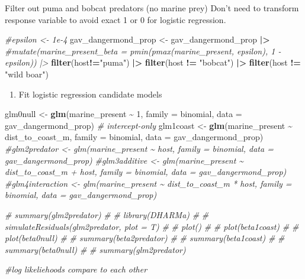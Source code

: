 \documentclass[
]{article}
\newenvironment{Shaded}{\begin{snugshade}}{\end{snugshade}}
\newcommand{\AttributeTok}[1]{\textcolor[rgb]{0.13,0.29,0.53}{#1}}
\newcommand{\CommentTok}[1]{\textcolor[rgb]{0.56,0.35,0.01}{\textit{#1}}}
\newcommand{\DecValTok}[1]{\textcolor[rgb]{0.00,0.00,0.81}{#1}}
\newcommand{\FunctionTok}[1]{\textcolor[rgb]{0.13,0.29,0.53}{\textbf{#1}}}
\newcommand{\NormalTok}[1]{#1}
\newcommand{\OtherTok}[1]{\textcolor[rgb]{0.56,0.35,0.01}{#1}}
\newcommand{\SpecialCharTok}[1]{\textcolor[rgb]{0.81,0.36,0.00}{\textbf{#1}}}
\newcommand{\StringTok}[1]{\textcolor[rgb]{0.31,0.60,0.02}{#1}}
\providecommand{\tightlist}{%
  \setlength{\itemsep}{0pt}\setlength{\parskip}{0pt}}
\begin{document}
Filter out puma and bobcat predators (no marine prey) Don't need to
transform response variable to avoid exact 1 or 0 for logistic
regression.

\begin{Shaded}
\begin{Highlighting}[]
\CommentTok{\#epsilon \textless{}{-} 1e{-}4}
\NormalTok{gav\_dangermond\_prop }\OtherTok{\textless{}{-}}\NormalTok{ gav\_dangermond\_prop }\SpecialCharTok{|\textgreater{}} 
  \CommentTok{\#mutate(marine\_present\_beta = pmin(pmax(marine\_present, epsilon), 1 {-} epsilon)) |\textgreater{} }
  \FunctionTok{filter}\NormalTok{(host}\SpecialCharTok{!=}\StringTok{"puma"}\NormalTok{) }\SpecialCharTok{|\textgreater{}} 
  \FunctionTok{filter}\NormalTok{(host }\SpecialCharTok{!=} \StringTok{"bobcat"}\NormalTok{) }\SpecialCharTok{|\textgreater{}} 
  \FunctionTok{filter}\NormalTok{(host }\SpecialCharTok{!=} \StringTok{"wild boar"}\NormalTok{)}
\end{Highlighting}
\end{Shaded}

\begin{enumerate}
\def\labelenumi{\arabic{enumi}.}
\setcounter{enumi}{1}
\tightlist
\item
  Fit logistic regression candidate models
\end{enumerate}

\begin{Shaded}
\begin{Highlighting}[]
\NormalTok{glm0null }\OtherTok{\textless{}{-}} \FunctionTok{glm}\NormalTok{(marine\_present }\SpecialCharTok{\textasciitilde{}} \DecValTok{1}\NormalTok{, }\AttributeTok{family =}\NormalTok{ binomial, }\AttributeTok{data =}\NormalTok{ gav\_dangermond\_prop)  }\CommentTok{\# intercept{-}only}
\NormalTok{glm1coast }\OtherTok{\textless{}{-}} \FunctionTok{glm}\NormalTok{(marine\_present }\SpecialCharTok{\textasciitilde{}}\NormalTok{ dist\_to\_coast\_m, }\AttributeTok{family =}\NormalTok{ binomial, }\AttributeTok{data =}\NormalTok{ gav\_dangermond\_prop)}
\CommentTok{\#glm2predator \textless{}{-} glm(marine\_present \textasciitilde{} host, family = binomial, data = gav\_dangermond\_prop)}
\CommentTok{\#glm3additive \textless{}{-} glm(marine\_present \textasciitilde{} dist\_to\_coast\_m + host, family = binomial, data = gav\_dangermond\_prop)}
\CommentTok{\#glm4interaction \textless{}{-} glm(marine\_present \textasciitilde{} dist\_to\_coast\_m * host, family = binomial, data = gav\_dangermond\_prop)}


\CommentTok{\# summary(glm2predator)}
\CommentTok{\# }
\CommentTok{\# library(DHARMa)}
\CommentTok{\# }
\CommentTok{\# simulateResiduals(glm2predator, plot = T)}
\CommentTok{\# }
\CommentTok{\# plot()}
\CommentTok{\# }
\CommentTok{\# plot(beta1coast)}
\CommentTok{\# }
\CommentTok{\# plot(beta0null)}
\CommentTok{\# }
\CommentTok{\# summary(beta2predator)}
\CommentTok{\# }
\CommentTok{\# summary(beta1coast)}
\CommentTok{\# }
\CommentTok{\# summary(beta0null)}
\CommentTok{\# }
\CommentTok{\# summary(glm2predator)}

\CommentTok{\#log likeliehoods compare to each other}
\end{Highlighting}
\end{Shaded}
\end{document}
